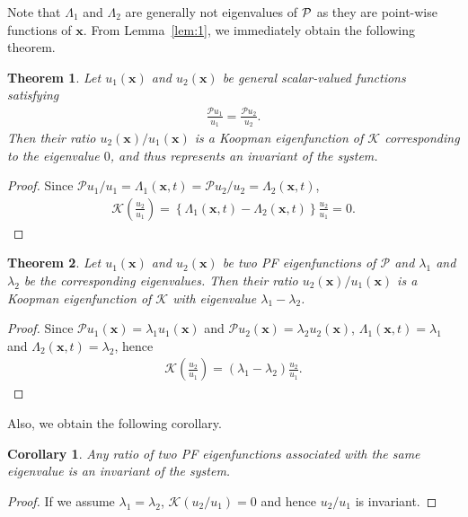 \documentclass[
amsmath,amssymb,
]{revtex4-2}
\newtheorem{theorem}{Theorem}
\newtheorem{corollary}{Corollary}
\begin{document}
%
Note that $\Lambda_1$ and $\Lambda_2$ are generally not eigenvalues of $\cal{P}$ as they are point-wise functions of ${\bm x}$.
%
From Lemma~\ref{lem:1}, we immediately obtain the following theorem. 
%
\begin{theorem}
    \label{thm:1}
    Let $u_1(\bm{x})$ and $u_2(\bm{x})$ be general scalar-valued functions satisfying
    \begin{align}
    \frac{\mathcal{P}u_1}{u_1} = \frac{\mathcal{P}u_2}{u_2}.
    \end{align}
    Then their ratio 
   ${u_2(\bm{x})} / {u_1(\bm{x})}$ is a Koopman eigenfunction of $\mathcal{K}$ corresponding to the eigenvalue $0$, and thus represents an invariant of the system.
\end{theorem}
\begin{proof} 
Since 
${\mathcal P}u_1 / u_1 = \Lambda_1({\bm x}, t) = {\mathcal P}u_2 / u_2 = \Lambda_2({\bm x}, t)$,
\begin{align}
    \mathcal{K} \left( \frac{u_2}{u_1} \right) = \left\{ \Lambda_1({\bm x}, t) - \Lambda_2({\bm x}, t)\right\} \frac{u_2}{u_1} = 0.
\end{align}
%
\end{proof}
%
\begin{theorem}
    \label{thm:2}
    Let $u_1(\bm{x})$ and $u_2(\bm{x})$
      be two PF eigenfunctions of $\mathcal{P}$ 
      and $\lambda_1$ and $\lambda_2$ be the corresponding eigenvalues.
    Then their ratio 
    ${u_2(\bm{x})} / {u_1(\bm{x})}$
     is a Koopman eigenfunction of $\mathcal{K}$ with eigenvalue $\lambda_1 - \lambda_2$.
\end{theorem}
%
\begin{proof} 
	Since $\mathcal{P} u_1({\bm x}) = \lambda_1 u_1({\bm x})$ and $\mathcal{P} u_2({\bm x}) = \lambda_2 u_2({\bm x})$, $\Lambda_1({\bm x}, t) = \lambda_1$ and $\Lambda_2({\bm x}, t) = \lambda_2$, hence
	\begin{align}
    \mathcal{K} \left( \frac{u_2}{u_1} \right) = ( \lambda_1 - \lambda_2 ) \frac{u_2}{u_1}.
	\end{align} 
%
\end{proof}

Also, we obtain the following corollary.
\begin{corollary}
    Any ratio of two PF eigenfunctions associated with the same eigenvalue is an invariant of the system.
\end{corollary} 
\begin{proof} 
If we assume $\lambda_1 = \lambda_2$, $\mathcal{K}( u_2 / u_1 ) = 0$ and hence $u_2 / u_1$ is invariant.
\end{proof} 
\end{document}

